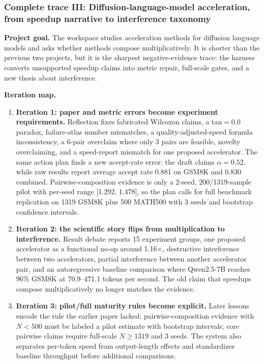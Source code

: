 \documentclass{article}
\begin{document}
\subsubsection{Complete trace III: Diffusion-language-model acceleration, from speedup narrative to interference taxonomy}

\textbf{Project goal.} The workspace studies acceleration methods for diffusion language models and asks whether methods compose multiplicatively. It is shorter than the previous two projects, but it is the sharpest negative-evidence trace: the harness converts unsupported speedup claims into metric repair, full-scale gates, and a new thesis about interference.

\textbf{Iteration map.}
\begin{enumerate}[leftmargin=*, itemsep=2pt]
  \item \textbf{Iteration 1: paper and metric errors become experiment requirements.} Reflection fixes fabricated Wilcoxon claims, a tau$=0.0$ paradox, failure-atlas number mismatches, a quality-adjusted-speed formula inconsistency, a 6-pair overclaim where only 3 pairs are feasible, novelty overclaiming, and a speed-report mismatch for one proposed accelerator. The same action plan finds a new accept-rate error: the draft claims $\alpha=0.52$, while raw results report average accept rate 0.881 on GSM8K and 0.830 combined. Pairwise-composition evidence is only a 2-seed, 200/1319-sample pilot with per-seed range [1.292, 1.478], so the plan calls for full benchmark replication on 1319 GSM8K plus 500 MATH500 with 3 seeds and bootstrap confidence intervals.
  \item \textbf{Iteration 2: the scientific story flips from multiplication to interference.} Result debate reports 15 experiment groups, one proposed accelerator as a functional no-op around 1.16$\times$, destructive interference between two accelerators, partial interference between another accelerator pair, and an autoregressive baseline comparison where Qwen2.5-7B reaches 96\% GSM8K at 70.9--471.1 tokens per second. The old claim that speedups compose multiplicatively no longer matches the evidence.
  \item \textbf{Iteration 3: pilot/full maturity rules become explicit.} Later lessons encode the rule the earlier paper lacked: pairwise-composition evidence with $N<500$ must be labeled a pilot estimate with bootstrap intervals; core pairwise claims require full-scale $N\ge1319$ and 3 seeds. The system also separates per-token speed from output-length effects and standardizes baseline throughput before additional comparisons.
\end{enumerate}
\end{document}
